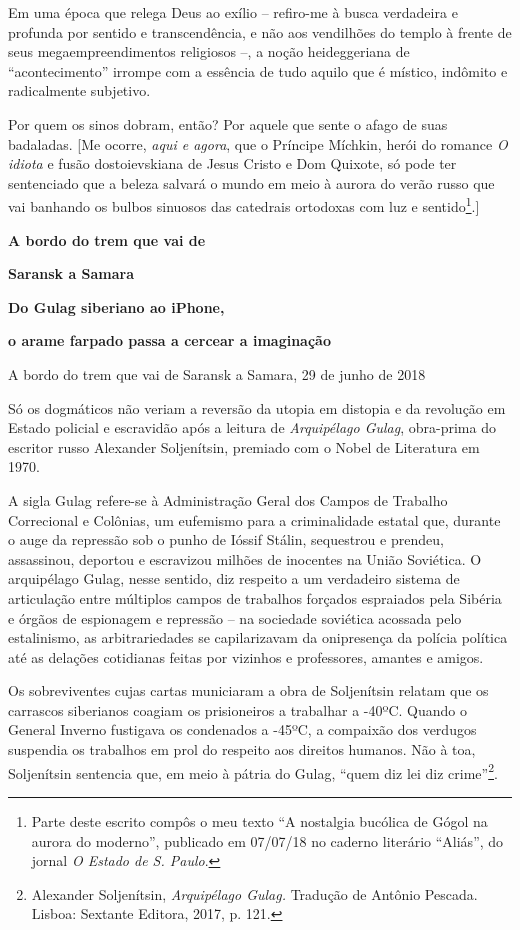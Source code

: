 Em uma época que relega Deus ao exílio -- refiro-me à busca verdadeira e
profunda por sentido e transcendência, e não aos vendilhões do templo à
frente de seus megaempreendimentos religiosos --, a noção heideggeriana
de ``acontecimento'' irrompe com a essência de tudo aquilo que é
místico, indômito e radicalmente subjetivo.

Por quem os sinos dobram, então? Por aquele que sente o afago de suas
badaladas. {[}Me ocorre, \emph{aqui e agora}, que o Príncipe Míchkin,
herói do romance \emph{O idiota} e fusão dostoievskiana de Jesus Cristo
e Dom Quixote, só pode ter sentenciado que a beleza salvará o mundo em
meio à aurora do verão russo que vai banhando os bulbos sinuosos das
catedrais ortodoxas com luz e sentido\footnote{Parte deste escrito
  compôs o meu texto ``A nostalgia bucólica de Gógol na aurora do
  moderno'', publicado em 07/07/18 no caderno literário ``Aliás'', do
  jornal \emph{O Estado de S. Paulo}.}.{]}

\textbf{A bordo do trem que vai de }

\textbf{Saransk a Samara}

\textbf{Do Gulag siberiano ao iPhone, }

\textbf{o arame farpado passa a cercear a imaginação}

A bordo do trem que vai de Saransk a Samara, 29 de junho de 2018

Só os dogmáticos não veriam a reversão da utopia em distopia e da
revolução em Estado policial e escravidão após a leitura de
\emph{Arquipélago Gulag}, obra-prima do escritor russo Alexander
Soljenítsin, premiado com o Nobel de Literatura em 1970.

A sigla Gulag refere-se à Administração Geral dos Campos de Trabalho
Correcional e Colônias, um eufemismo para a criminalidade estatal que,
durante o auge da repressão sob o punho de Ióssif Stálin, sequestrou e
prendeu, assassinou, deportou e escravizou milhões de inocentes na União
Soviética. O arquipélago Gulag, nesse sentido, diz respeito a um
verdadeiro sistema de articulação entre múltiplos campos de trabalhos
forçados espraiados pela Sibéria e órgãos de espionagem e repressão --
na sociedade soviética acossada pelo estalinismo, as arbitrariedades se
capilarizavam da onipresença da polícia política até as delações
cotidianas feitas por vizinhos e professores, amantes e amigos.

Os sobreviventes cujas cartas municiaram a obra de Soljenítsin relatam
que os carrascos siberianos coagiam os prisioneiros a trabalhar a -40ºC.
Quando o General Inverno fustigava os condenados a -45ºC, a compaixão
dos verdugos suspendia os trabalhos em prol do respeito aos direitos
humanos. Não à toa, Soljenítsin sentencia que, em meio à pátria do
Gulag, ``quem diz lei diz crime''\footnote{Alexander Soljenítsin,
  \emph{Arquipélago Gulag.} Tradução de Antônio Pescada. Lisboa:
  Sextante Editora, 2017, p. 121.}.

